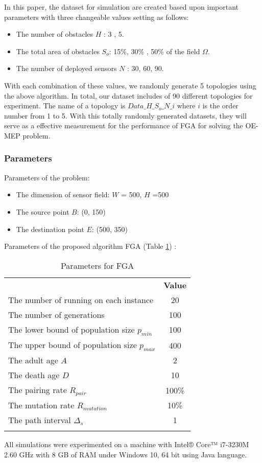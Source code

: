 \documentclass[final]{elsarticle}
\begin{document}
In this paper, the dataset for simulation are created based upon important parameters with three changeable values setting as follows:
\begin{itemize}
	\item The number of obstacles $H$ : 3 , 5.
	\item The total area of obstacles $S_o$: 15\%, 30\% , 50\% of the field $\Omega$.
	\item The number of deployed sensors $N$ : 30, 60, 90.
\end{itemize}
With each combination of these values, we randomly generate 5 topologies using the above algorithm. In total, our dataset includes of 90 different topologies for experiment. The name of a topology is $Data\_H\_S_o\_N\_i$ where $ i $ is the order number from 1 to 5. With this totally randomly generated datasets, they will serve as a effective measurement for the performance of FGA for solving the OE-MEP problem. 

\subsubsection{Parameters}
Parameters of the problem:
\begin{itemize}
	\item The dimension of sensor field: $ W $ = 500, $ H $ =500
	\item The source point $ B $: (0, 150) 
	\item The destination point $ E $: (500, 350)	
\end{itemize}
Parameters of the proposed algorithm FGA (Table \ref{tab1}) :
\begin{table}
	\caption{Parameters for FGA}
	\label{tab1}       %
	\begin{center}
		\renewcommand{\arraystretch}{1.5}
		\begin{tabular}{lc}
			\hline\noalign{\smallskip}
			\multicolumn{1}{c}{\textbf{Parameter}} & \textbf{Value} \\
			\noalign{\smallskip}\hline\noalign{\smallskip}
			The number of running on each instance & 20 \\
			The number of generations & 100\\
			The lower bound of population size $ p_{min} $ & 100\\
			The upper bound of population size $ p_{max} $ & 400\\
			The adult age $A$ & 2 \\
			The death age $D$ & 10 \\
			The pairing rate $ R_{pair}$  & 100\% \\
			The mutation rate $ R_{mutation} $ & 10\% \\
			The path interval $\Delta_s$ & 1 \\ 
			\noalign{\smallskip} \hline
		\end{tabular}
	\end{center}
\end{table}
All simulations were experimented on a machine with Intel® Core™ i7-3230M 2.60 GHz with 8 GB of RAM under Windows 10, 64 bit using Java language.
\end{document}
